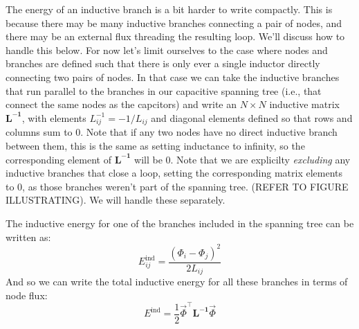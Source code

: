 The energy of an inductive branch is a bit harder to write compactly. This is because there may be many inductive branches connecting a pair of nodes, and there may be an external flux threading the resulting loop. We'll discuss how to handle this below. For now let's limit ourselves to the case where nodes and branches are defined such that there is only ever a single inductor directly connecting two pairs of nodes. In that case we can take the inductive branches that run parallel to the branches in our capacitive spanning tree (i.e., that connect the same nodes as the capcitors) and write an $N\times N$ inductive matrix $\mathbf{L^{-1}}$, with elements $L_{ij}^{-1} = -1 / L_{ij}$ and diagonal elements defined so that rows and columns sum to 0.  Note that if any two nodes have no direct inductive branch between them, this is the same as setting inductance to infinity, so the corresponding element of $\mathbf{L^{-1}}$ will be 0. Note that we are explicilty \textit{excluding} any inductive branches that close a loop, setting the corresponding matrix elements to 0, as those branches weren't part of the spanning tree. (REFER TO FIGURE ILLUSTRATING). We will handle these separately.

The inductive energy for one of the branches included in the spanning tree can be written as:%
\begin{equation}
\label{eq:Eind}
    E_{ij}^\mathrm{ind} = \frac{(\Phi_i-\Phi_j)^2}{2L_{ij}}
\end{equation}
And so we can write the total inductive energy for all these branches in terms of node flux:
\begin{equation}
    \label{eq:matrixEind}
    E^\mathrm{ind} = \frac{1}{2}\vec{\Phi}^\top\mathbf{L^{-1}}\vec{\Phi}
\end{equation}



